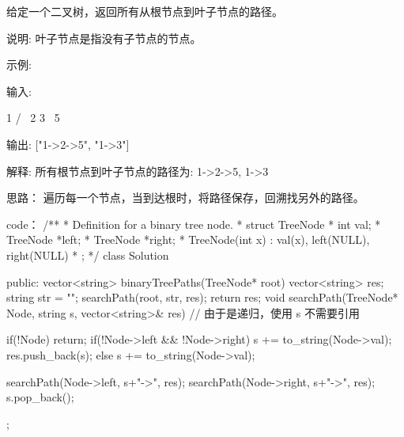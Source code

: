 给定一个二叉树，返回所有从根节点到叶子节点的路径。

说明: 叶子节点是指没有子节点的节点。

示例:

输入:

   1
 /   \
2     3
 \
  5

输出: ["1->2->5", "1->3"]

解释: 所有根节点到叶子节点的路径为: 1->2->5, 1->3





























思路：
遍历每一个节点，当到达根时，将路径保存，回溯找另外的路径。




































code：
/**
 * Definition for a binary tree node.
 * struct TreeNode {
 *     int val;
 *     TreeNode *left;
 *     TreeNode *right;
 *     TreeNode(int x) : val(x), left(NULL), right(NULL) {}
 * };
 */
class Solution {
public:
    vector<string> binaryTreePaths(TreeNode* root) {
        vector<string> res;
        string str = "";
        searchPath(root, str, res);
        return res;
    }
    void searchPath(TreeNode* Node, string s, vector<string>& res) // 由于是递归，使用 s 不需要引用
    {
        if(!Node) return;
        if(!Node->left && !Node->right)
        {
            s += to_string(Node->val);
            res.push_back(s);
        }
        else s += to_string(Node->val);

        searchPath(Node->left, s+"->", res);
        searchPath(Node->right, s+"->", res);
        s.pop_back();
    }
};